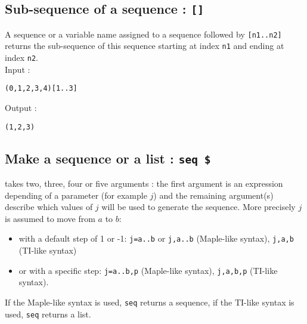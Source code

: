 \documentclass[a4paper,11pt]{book}
\begin{document}
\subsection{Sub-sequence of a sequence : {\tt []}}\index{[]}
A sequence or a variable name assigned to a sequence followed by
{\tt [n1..n2]} returns the sub-sequence of this sequence
starting at index {\tt n1} and ending at index {\tt n2}.\\
Input :
\begin{center}{\tt (0,1,2,3,4)[1..3]}\end{center}
Output :
\begin{center}{\tt (1,2,3)}\end{center}

\subsection{Make a sequence or a list : {\tt seq \$}}\label{sec:seq}
 takes two, three, four or five arguments : the first 
argument is an expression depending of a parameter (for example $j$) and  
the remaining argument(s) describe which values of $j$ will be used to
generate the sequence. More precisely $j$ is assumed to move 
from $a$ to $b$:
\begin{itemize}
\item with a default step of 1 or -1: {\tt j=a..b} or 
{\tt j,a..b} (Maple-like syntax), {\tt j,a,b} (TI-like syntax)
\item or with a specific step: 
{\tt j=a..b,p} (Maple-like syntax), {\tt j,a,b,p} (TI-like syntax).
\end{itemize}
If the Maple-like syntax is used, {\tt seq} returns a sequence,
if the TI-like syntax is used, {\tt seq} returns a list.
 
\end{document}

